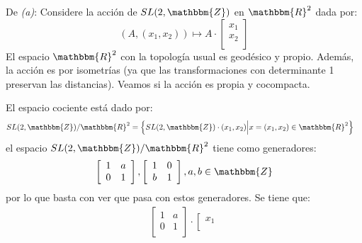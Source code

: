 \documentclass[12pt]{report}
\newcounter{it}
\theoremstyle{largebreak}
\newcommand{\bbm}[1]{\ensuremath{\mathbbm{#1}}}
\begin{document}
    \begin{sol}
        De \textit{(a)}: Considere la acción de $SL(2,\bbm{Z})$ en $\bbm{R}^2$ dada por:
        \begin{equation*}
            (A,(x_1,x_2))\mapsto A\cdot\left[\begin{array}{c}
                x_1 \\
                x_2 \\
            \end{array} \right]
        \end{equation*}
        El espacio $\bbm{R}^2$ con la topología usual es geodésico y propio. Además, la acción es por isometrías (ya que las transformaciones con determinante 1 preservan las distancias). Veamos si la acción es propia y cocompacta.

        El espacio cociente está dado por:
        \begin{equation*}
            \begin{split}
                SL(2,\bbm{Z})/\bbm{R}^2&=\left\{SL(2,\bbm{Z})\cdot(x_1,x_2)\Big|x=(x_1,x_2)\in\bbm{R}^2 \right\}
            \end{split}
        \end{equation*}
        el espacio $SL(2,\bbm{Z})/\bbm{R}^2$ tiene como generadores:
        \begin{equation*}
            \left[\begin{array}{cc}
                1 & a \\
                0 & 1 \\
            \end{array} \right],\left[\begin{array}{cc}
                1 & 0 \\
                b & 1 \\
            \end{array} \right],a,b\in\bbm{Z}
        \end{equation*}
        por lo que basta con ver que pasa con estos generadores. Se tiene que:
        \begin{equation*}
            \begin{split}
                \left[\begin{array}{cc}
                    1 & a \\
                    0 & 1 \\
                \end{array} \right]\cdot\left[\begin{array}{c}
                    x_1 \\

\end{array}
\end{split}
\end{equation*}
\end{sol}
\end{document}

